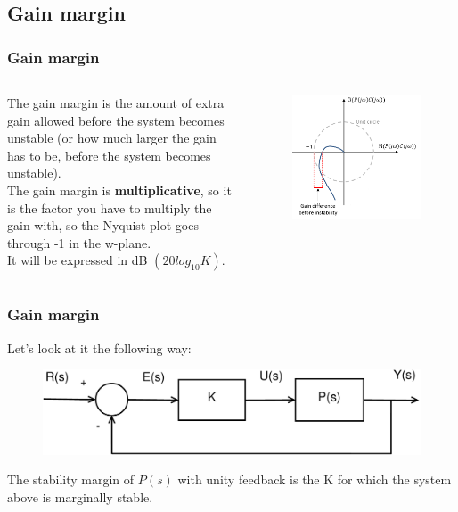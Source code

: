 \subsection{Gain margin}

\begin{frame}
	\frametitle{Gain margin}
	\begin{columns}
		The gain margin is the amount of extra gain allowed before the system becomes unstable (or how much larger the gain has to be, before the system becomes unstable).\\
		\medskip
		The gain margin is \textbf{multiplicative}, so it is the factor you have to multiply the gain with, so the Nyquist plot goes through -1 in the w-plane.\\
		It will be expressed in dB $(20log_{10}K)$.
		\vspace{-4ex}
		\begin{figure}
			\includegraphics[width=1.1\linewidth]{gain_margin}
		\end{figure}
	\end{columns}
\end{frame}

\begin{frame}
	\frametitle{Gain margin}
	\vspace{-6ex}
	Let's look at it the following way:
	\begin{figure}
		\includegraphics[width=0.8\linewidth]{closedloop2}
	\end{figure}
	The stability margin of $P(s)$ with unity feedback is the K for which the system above is marginally stable.
\end{frame}

